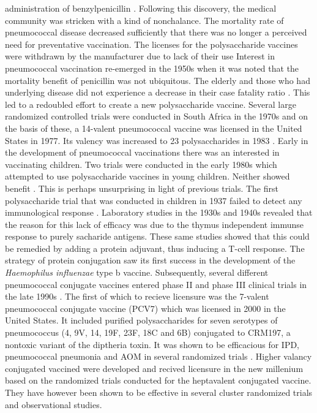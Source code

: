 \documentclass[]{book}
\theoremstyle{definition}
\theoremstyle{definition}
\theoremstyle{definition}
\theoremstyle{remark}
\begin{document}
administration of benzylpenicillin \citep{Tillett1943}. Following this
discovery, the medical community was stricken with a kind of
nonchalance. The mortality rate of pneumococcal disease decreased
sufficiently that there was no longer a perceived need for preventative
vaccination. The licenses for the polysaccharide vaccines were withdrawn
by the manufacturer due to lack of their use \citep{Austrian1999a}
Interest in pneumococcal vaccination re-emerged in the 1950s when it was
noted that the mortality benefit of penicillin was not ubiquitous. The
elderly and those who had underlying disease did not experience a
decrease in their case fatality ratio \citep{Austrian1964}. This led to
a redoubled effort to create a new polysaccharide vaccine. Several large
randomized controlled trials were conducted in South Africa in the 1970s
\citep[\citet{Smit1977}]{Austrian1976} and on the basis of these, a
14-valent pneumococcal vaccine was licensed in the United States in
1977. Its valency was increased to 23 polysaccharides in 1983
\citep{Austrian1999a}. Early in the development of pneumococcal
vaccinations there was an interested in vaccinating children. Two trials
were conducted in the early 1980s which attempted to use polysaccharide
vaccines in young children. Neither showed benefit
\citep{Makela1981, Sloyer1981}. This is perhaps unsurprising in light of
previous trials. The first polysaccharide trial that was conducted in
children in 1937 failed to detect any immunological response
\citep{Davies1937}. Laboratory studies in the 1930s and 1940s revealed
that the reason for this lack of efficacy was due to the thymus
independent immunse response to purely sacharide antigens. These same
studies showed that this could be remedied by adding a protein adjuvant,
thus inducing a T-cell response. The strategy of protein conjugation saw
its first success in the development of the \emph{Haemophilus
influenzae} type b vaccine. Subsequently, several different pneumococcal
conjugate vaccines entered phase II and phase III clinical trials in the
late 1990s \citep{Austrian1999a}. The first of which to recieve
licensure was the 7-valent pneumococcal conjugate vaccine (PCV7) which
was licensed in 2000 in the United States. It included purified
polysaccharides for seven serotypes of pneumococcus (4, 9V, 14, 19F,
23F, 18C and 6B) conjugated to CRM197, a nontoxic variant of the
diptheria toxin. It was shown to be efficacious for IPD, pneumococcal
pneumonia and AOM in several randomized trials \citep{Black2000}. Higher
valancy conjugated vaccined were developed and recived licensure in the
new millenium based on the randomized trials conducted for the
heptavalent conjugated vaccine. They have however been shown to be
effective in several cluster randomized trials and observational
studies.
\end{document}

